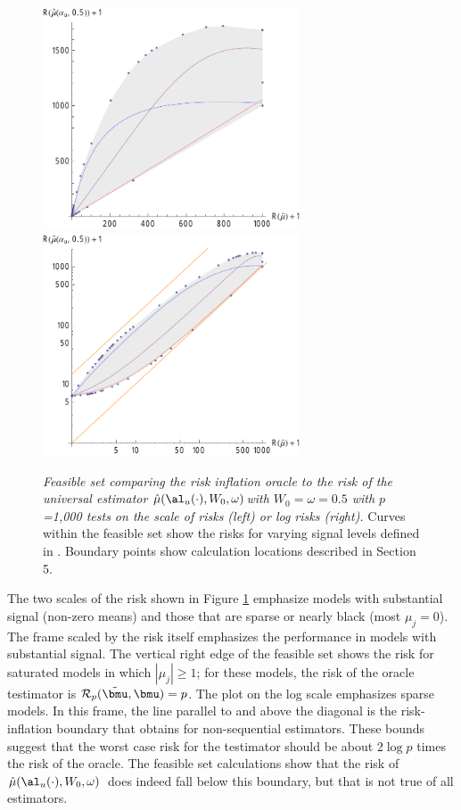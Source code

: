\documentclass[12pt]{article}
\newcommand{\uTest}{\mbox{$\hat\mu(\al_u(\cdot),W_0,\omega)$}}
\begin{document}
 \begin{figure}
 \caption{ \label{fig:riFeasibleSet} {\sl Feasible set comparing the risk
 inflation oracle to the risk of the universal estimator \uTest with
 $W_0=\omega=0.5$ with $p$=1,000 tests on the scale of risks (left) or log risks
 (right).}  Curves within the feasible set show the risks for varying signal
 levels defined in . Boundary points show calculation locations described in Section 5. }

 \vspace{0.1in}
\centerline{
 \includegraphics[width=3.0in]{figures/riFeasSet}
 \includegraphics[width=3.0in]{figures/riFeasSetLog} }
 \vspace{0.2in}
 \end{figure}


 The two scales of the risk shown in Figure \ref{fig:riFeasibleSet} emphasize
 models with substantial signal (non-zero means) and those that are sparse or
 nearly black (most $\mu_j=0$).  The frame scaled by the risk itself emphasizes
 the performance in models with substantial signal.  The vertical right edge of
 the feasible set shows the risk for saturated models in which $|\mu_j| \ge 1$;
 for these models, the risk of the oracle testimator is ${\cal
 R}_p(\tilde{\bmu}, \bmu) = p$.  The plot on the log scale emphasizes sparse
 models.  In this frame, the line parallel to and above the diagonal is the
 risk-inflation boundary  that obtains for non-sequential estimators.
  These bounds suggest that the worst case risk for the testimator should be
 about $2 \log p$ times the risk of the oracle.  The feasible set calculations
 show that the risk of \uTest\ does indeed fall below this boundary, but that is
 not true of all estimators. 
\end{document}
